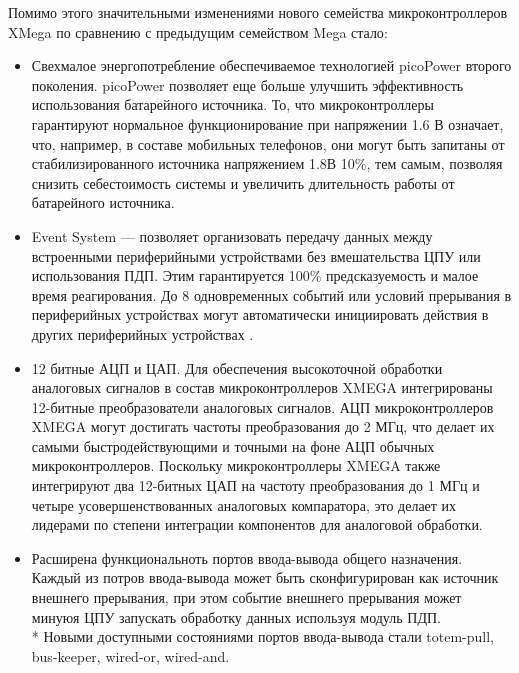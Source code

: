 Помимо этого значительными изменениями нового семейства микроконтроллеров XMega по сравнению
с предыдущим семейством Mega стало\cite{avrref}:
\begin{itemize}
    \item{} Свехмалое энергопотребление обеспечиваемое технологией picoPower второго поколения.
    picoPower позволяет еще больше улучшить эффективность использования батарейного источника.
    То, что микроконтроллеры гарантируют нормальное функционирование при напряжении 1.6 В означает,
    что, например, в составе мобильных телефонов, они могут быть запитаны от стабилизированного
    источника напряжением 1.8В 10\%, тем самым, позволяя снизить себестоимость системы и увеличить
    длительность работы от батарейного источника. 
    \item{} Event System ---  позволяет организовать передачу данных между встроенными периферийными
    устройствами без вмешательства ЦПУ или использования ПДП.
    Этим гарантируется 100\% предсказуемость и малое время реагирования.
    До 8 одновременных событий или условий прерывания в периферийных устройствах могут автоматически
    инициировать действия в других периферийных устройствах \cite{avrxm}.
    \item{} 12 битные АЦП и ЦАП. Для обеспечения высокоточной обработки аналоговых сигналов в состав 
    микроконтроллеров XMEGA интегрированы 12-битные преобразователи аналоговых сигналов. АЦП
    микроконтроллеров XMEGA могут достигать частоты преобразования до 2 МГц, что делает их самыми
        быстродействующими и точными на фоне АЦП обычных микроконтроллеров.
        Поскольку микроконтроллеры XMEGA также интегрируют два 12-битных ЦАП на частоту преобразования
        до 1 МГц и четыре усовершенствованных аналоговых компаратора, это делает их лидерами по
        степени интеграции компонентов для аналоговой обработки.
    \item{} Расширена функциональноть портов ввода-вывода общего назначения. Каждый из потров
    ввода-вывода может быть сконфигурирован как источник внешнего прерывания, при этом событие внешнего прерывания
    может минуюя ЦПУ запускать обработку данных используя модуль ПДП. \\*
    Новыми доступными состояниями портов ввода-вывода стали totem-pull, bus-keeper, wired-or, wired-and.
\end{itemize}


